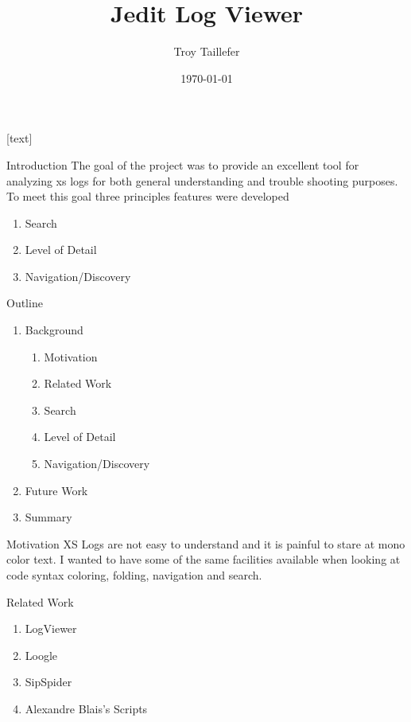 \documentclass{beamer}
\title{Jedit Log Viewer}
\author{Troy Taillefer}
\institute{Broadsoft}
\date{\today}
\begin{document}
[text]

\frame{\titlepage}

\begin{frame}{Introduction}
The goal of the project was to provide an excellent tool for analyzing xs logs 
for both general understanding and trouble shooting purposes. To meet this goal three
principles features were developed

\begin{enumerate}
\item Search
\item Level of Detail
\item Navigation/Discovery
\end{enumerate}
\end{frame}

\begin{frame}{Outline}
\begin{enumerate}
\item Background
\begin{enumerate}
\item Motivation
\item Related Work
\item Search
\item Level of Detail
\item Navigation/Discovery
\end{enumerate}
\item Future Work
\item Summary
\end{enumerate}
\end{frame}


\begin{frame}{Motivation}
XS Logs are not easy to understand and 
it is painful to stare at mono color text. I wanted to have some of the same facilities available when looking at code syntax coloring, folding, navigation and search. 
\end{frame}

\begin{frame}{Related Work}

\begin{enumerate}
\item LogViewer
\item Loogle\cite{Loogle}
\item SipSpider
\item Alexandre Blais's Scripts
\end{enumerate}
\end{frame}
\end{document}
